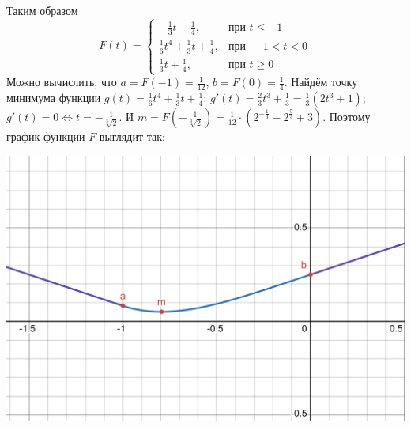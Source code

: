 Таким образом
\[F(t) = \begin{cases}\displaystyle
	-\frac13 t - \frac14, &\text{при } t \leqslant -1 \\[8pt]
	\displaystyle \frac16 t^4 + \frac13 t + \frac14, &\text{при } -1< t < 0 \\[8pt]
	\displaystyle \frac13 t + \frac14, &\text{при } t \geqslant 0
\end{cases}\]
Можно вычислить, что  $a = F(-1) = \frac{1}{12}$, $b = F(0) = \frac14$.
Найдём точку минимума функции $g(t) = \frac16 t^4 + \frac13 t + \frac14$:
$g'(t) = \frac23t^3 + \frac13 = \frac13 (2t^3 + 1)$; $g'(t) = 0 \Leftrightarrow t = -\frac{1}{\sqrt[3]{2}}$.
И $m = F\left(-\frac{1}{\sqrt[3]{2}}\right) = \frac{1}{12}\cdot\left(2^{-\frac13} - 2^{\frac53}+3\right)$.
Поэтому график функции $F$ выглядит так:
\begin{center}
\includegraphics[width=\textwidth]{graphic.pdf}
\end{center}